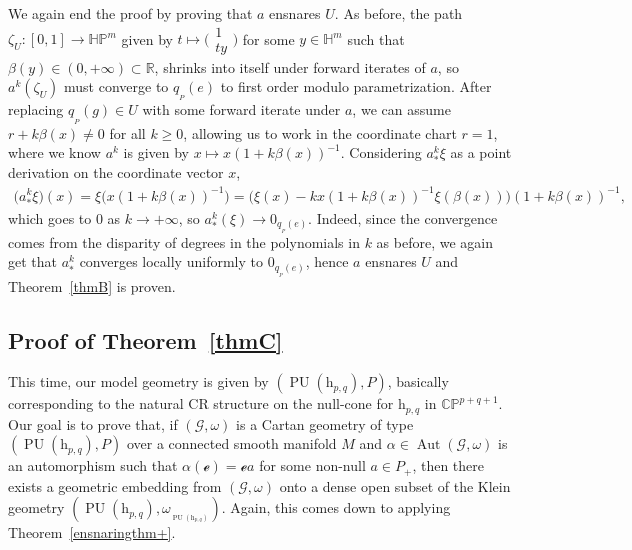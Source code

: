\documentclass[10pt,a4paper]{amsart}
\numberwithin{equation}{section}
\theoremstyle{definition}
\DeclareMathOperator{\Aut}{\mathrm{Aut}}
\DeclareMathOperator{\PU}{\mathrm{PU}}
\newcommand{\MC}[1]{\omega_{{}_{#1}}}
\begin{document}
We again end the proof by proving that $a$ ensnares $U$. As before, the path $\zeta_U\colon [0,1]\to\mathbb{HP}^m$ given by $t\mapsto\bigl(\begin{smallmatrix}1 \\ ty\end{smallmatrix}\bigr)$ for some $y\in\mathbb{H}^m$ such that $\beta(y)\in(0,+\infty)\subset\mathbb{R}$, shrinks into itself under forward iterates of $a$, so $a^k(\zeta_U)$ must converge to $q_{{}_P}(e)$ to first order modulo parametrization. After replacing $q_{{}_P}(g)\in U$ with some forward iterate under $a$, we can assume $r+k\beta(x)\neq 0$ for all $k\geq 0$, allowing us to work in the coordinate chart $r=1$, where we know $a^k$ is given by $x\mapsto x(1+k\beta(x))^{-1}$. Considering $a^k_*\xi$ as a point derivation on the coordinate vector $x$,
\begin{align*}\bigl(a^k_*\xi\bigr)(x)   =\xi\bigl(x(1+k\beta(x))^{-1}\bigr)  =\big(\xi(x)-kx(1+k\beta(x))^{-1}\xi(\beta(x))\big)(1+k\beta(x))^{-1},
\end{align*} which goes to $0$ as $k\rightarrow+\infty$, so $a^k_*(\xi)\rightarrow 0_{q_{{}_P}(e)}$. Indeed, since the convergence comes from the disparity of degrees in the polynomials in $k$ as before, we again get that $a^k_*$ converges locally uniformly to $0_{q_{{}_P}(e)}$, hence $a$ ensnares $U$ and Theorem~\ref{thmB} is proven.

\subsection{Proof of Theorem~\ref{thmC}} This time, our model geometry is given by $(\PU(\mathrm{h}_{p,q}),P)$, basically corresponding to the natural CR structure on the null-cone for $\mathrm{h}_{p,q}$ in $\mathbb{CP}^{p+q+1}$. Our goal is to prove that, if $(\mathscr{G},\omega)$ is a Cartan geometry of type $(\PU(\mathrm{h}_{p,q}),P)$ over a connected smooth manifold $M$ and $\alpha\in\Aut(\mathscr{G},\omega)$ is an automorphism such that $\alpha(\mathscr{e})=\mathscr{e}a$ for some non-null $a\in P_+$, then there exists a geometric embedding from $(\mathscr{G},\omega)$ onto a dense open subset of the Klein geometry $(\PU(\mathrm{h}_{p,q}),\MC{\PU(\mathrm{h}_{p,q})})$. Again, this comes down to applying Theorem~\ref{ensnaringthm+}.
\end{document}
